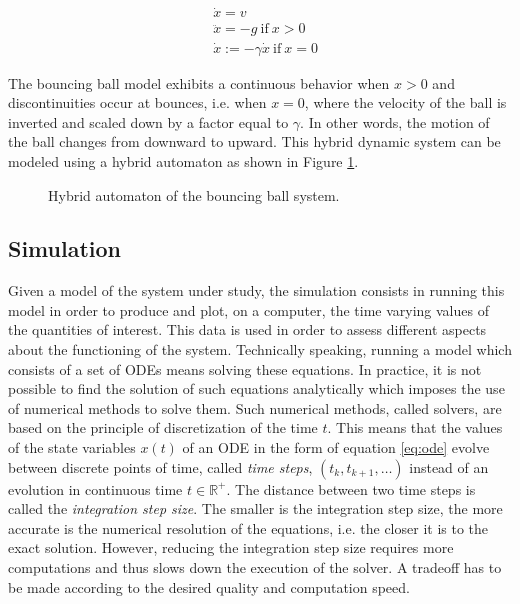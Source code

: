 \begin{equation}
\begin{aligned}
&\dot{x} = v\\
&\ddot{x} = -g\ \text{if}\ x > 0\\
&\dot{x} := -\gamma \dot{x}\ \text{if}\ x = 0 
\end{aligned}
\label{eq:bb}
\end{equation}  

The bouncing ball model exhibits a continuous behavior when $x > 0$ and discontinuities occur at bounces, i.e. when $x = 0$, where the velocity of the ball is inverted and scaled down by a factor equal to $\gamma$. In other words, the motion of the ball changes from downward to upward. This hybrid dynamic system can be modeled using a hybrid automaton as shown in Figure \ref{fig:bbautomaton}.

\begin{figure}[phbt]
\centering

\caption{Hybrid automaton of the bouncing ball system.}
\label{fig:bbautomaton}
\end{figure}

\subsection{Simulation}

Given a model of the system under study, the simulation consists in running this model in order to produce and plot, on a computer, the time varying values of the quantities of interest. This data is used in order to assess different aspects about the functioning of the system. Technically speaking, running a model which consists of a set of ODEs means solving these equations. In practice, it is not possible to find the solution of such equations analytically which imposes the use of numerical methods to solve them. Such numerical methods, called solvers, are based on the principle of discretization of the time $t$. This means that the values of the state variables $x(t)$ of an ODE in the form of equation \ref{eq:ode} evolve between discrete points of time, called \textit{time steps}, $(t_k, t_{k+1}, \ldots)$ instead of an evolution in continuous time $t \in \mathbb{R}^+$. The distance between two time steps is called the \textit{integration step size}. The smaller is the integration step size, the more accurate is the numerical resolution of the equations, i.e. the closer it is to the exact solution. However, reducing the integration step size requires more computations and thus slows down the execution of the solver. A tradeoff has to be made according to the desired quality and computation speed.

